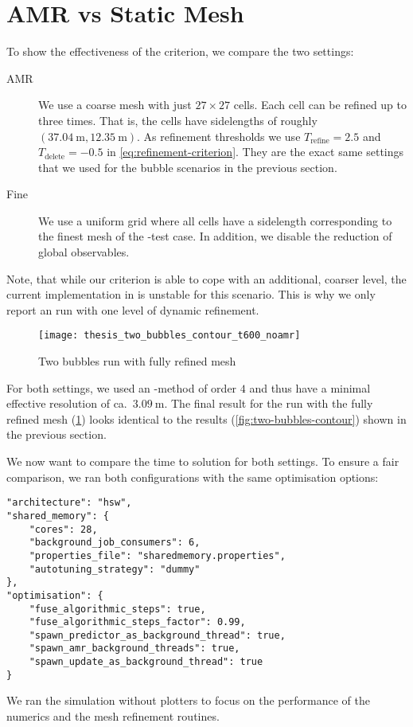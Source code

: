 \section{AMR vs Static Mesh}\label{sec:results-tts-amr}
To show the effectiveness of the \amr{} criterion, we compare the two settings:
\begin{description}
\item[AMR] We use a coarse mesh with just $27 \times 27$ cells.
  Each cell can be refined up to three times.
  That is, the cells have sidelengths of roughly $\left(\SI{37.04}{\m}, \SI{12.35}{\m} \right)$.
  As refinement thresholds we use $T_\text{refine} = 2.5$ and $T_\text{delete} = -0.5$ in \cref{eq:refinement-criterion}.
  They are the exact same settings that we used for the bubble scenarios in the previous section.
\item[Fine] We use a uniform grid where all cells have a sidelength corresponding to the finest mesh of the \amr{}-test case.
  In addition, we disable the reduction of global observables.
\end{description}
Note, that while our \amr{} criterion is able to cope with an additional, coarser level, the current implementation in \exahype{} is unstable for this scenario.
This is why we only report an \amr{} run with one level of dynamic refinement.

\begin{figure}[htb]
  \centering
  \texttt{[image: thesis\_two\_bubbles\_contour\_t600\_noamr]} 
  \caption{\label{fig:two-bubbles-noamr-contour}%
    Two bubbles run with fully refined mesh}
\end{figure}
For both settings, we used an \aderdg{}-method of order $4$ and thus have a minimal effective resolution of ca.\ $\SI{3.09}{\m}$.
The final result for the run with the fully refined mesh (\cref{fig:two-bubbles-noamr-contour}) looks identical to the \amr{} results (\cref{fig:two-bubbles-contour}) shown in the previous section.

We now want to compare the time to solution for both settings.
To ensure a fair comparison, we ran both configurations with the same optimisation options:
\begin{verbatim}
"architecture": "hsw",
"shared_memory": {
    "cores": 28,
    "background_job_consumers": 6,
    "properties_file": "sharedmemory.properties",
    "autotuning_strategy": "dummy"
},
"optimisation": {
    "fuse_algorithmic_steps": true,
    "fuse_algorithmic_steps_factor": 0.99,
    "spawn_predictor_as_background_thread": true,
    "spawn_amr_background_threads": true,
    "spawn_update_as_background_thread": true
}
\end{verbatim}
We ran the simulation without plotters to focus on the performance of the numerics and the mesh refinement routines.

